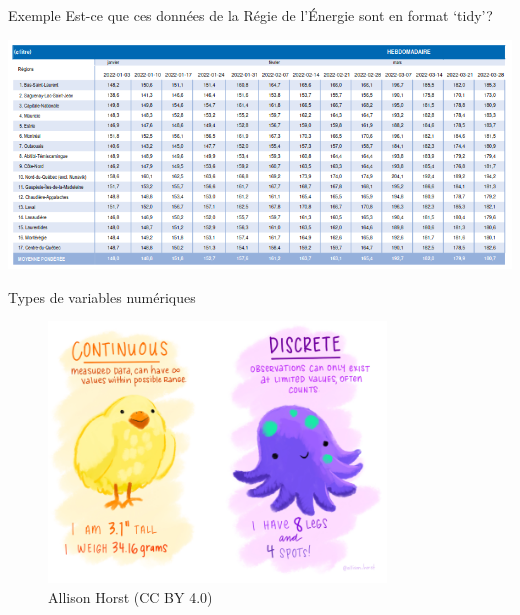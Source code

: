 \documentclass[
  ignorenonframetext,
]{beamer}
\begin{document}
\begin{frame}{Exemple}
\protect\hypertarget{exemple}{}
Est-ce que ces données de la Régie de l'Énergie sont en format `tidy'?

\includegraphics[width=1\textwidth,height=\textheight]{figures/regie-energie.png}
\end{frame}

\begin{frame}{Types de variables numériques}
\protect\hypertarget{types-de-variables-numuxe9riques}{}
\begin{figure}

{\centering \includegraphics[width=0.8\textwidth,height=\textheight]{figures/continuous_discrete.png}

}

\caption{Allison Horst (CC BY 4.0)}

\end{figure}
\end{frame}
\end{document}
